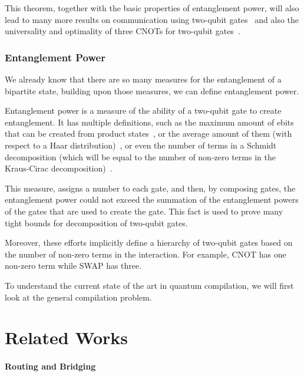 This theorem, together with the basic properties of entanglement power, will also lead to many more results on communication using two-qubit gates~\cite{berry2002} and also the universality and optimality of three CNOTs for two-qubit gates~\cite{vatan2004}.


\subsection{Entanglement Power}

We already know that there are so many measures for the entanglement of a bipartite state, building upon those measures, we can define entanglement power.

Entanglement power is a measure of the ability of a two-qubit gate to create entanglement. It has multiple definitions, such as the maximum amount of ebits that can be created from product states~\cite{shen2018}, or the average amount of them (with respect to a Haar distribution)~\cite{zanardi2000}, or even the number of terms in a Schmidt decomposition (which will be equal to the number of non-zero terms in the Kraus-Cirac decomposition)~\cite{nielsen2003}.

This measure, assigns a number to each gate, and then, by composing gates, the entanglement power could not exceed the summation of the entanglement powers of the gates that are used to create the gate. This fact is used to prove many tight bounds for decomposition of two-qubit gates.

Moreover, these efforts implicitly define a hierarchy of two-qubit gates based on the number of non-zero terms in the interaction. For example, CNOT has one non-zero term while SWAP has three.

To understand the current state of the art in quantum compilation, we will first look at the general compilation problem. 


\chapter{Related Works}\label{chap:discussion}

\subsubsection{Routing and Bridging}




